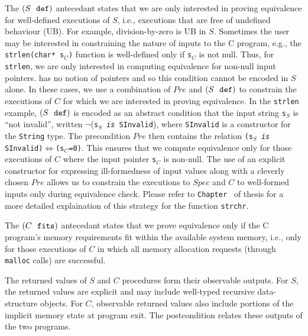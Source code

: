 The $(S\ \  \mathrm{\tt def})$ antecedant states that we are only
interested in proving equivalence for well-defined
executions of $S$, i.e., executions that are
free of undefined
behaviour (UB). For example, division-by-zero is UB
in $S$.
Sometimes
the user may be interested in constraining the nature of
inputs to the C program, e.g., the {\tt strlen(char* s$_C$)} function
is well-defined only if {\tt s$_C$} is not null.
Thus,
for {\tt strlen}, we are only interested in computing
equivalence for non-null input pointers. \SpecL{} has
no notion of pointers and so this condition cannot be encoded
in $S$ alone.
In these cases, we use a combination of
$Pre$ and $(S\ \  \mathrm{\tt def})$
to constrain the executions of $C$ for which we
are interested in proving equivalence. In the {\tt strlen} example,
$(S\ \  \mathrm{\tt def})$
is encoded as an
abstract condition that the input string {\tt s}$_S$ is ``not invalid'',
written $\neg$({\tt s$_S$ {\em is} SInvalid}), where {\tt SInvalid} is
a constructor for the \SpecL{} {\tt String} type.
The precondition $Pre$ then contains the relation {\tt (s$_S$ {\em is} SInvalid)$\Leftrightarrow$({\tt s$_C$}=0)}.
This ensures that we compute equivalence only for those executions
of $C$ where the input pointer {\tt s$_C$} is non-null.
The use of an explicit constructor for expressing ill-formedness
of \SpecL{} input values along with a cleverly chosen $Pre$ allows us
to constrain the executions to $Spec$ and $C$ to well-formed inputs
only during equivalence check.
Please refer to {\tt Chapter \ThesisChapterEval{}} of thesis for
a more detailed explaination of this strategy for
the function {\tt strchr}.

The $(C\ \  \mathrm{\tt fits})$ antecedant states that we
prove equivalence only if the C program's memory requirements
fit within the available system memory, i.e.,
only for those executions of $C$ in which all
memory allocation requests (through {\tt malloc} calls)
are successful.

The returned values of $S$ and
$C$ procedures form their observable outputs.
For $S$, the returned values are
explicit and may include well-typed
recursive data-structure objects.
For $C$,
observable returned values also include portions
of the implicit memory state at
program exit. The postcondition relates these outputs of
the two programs.

